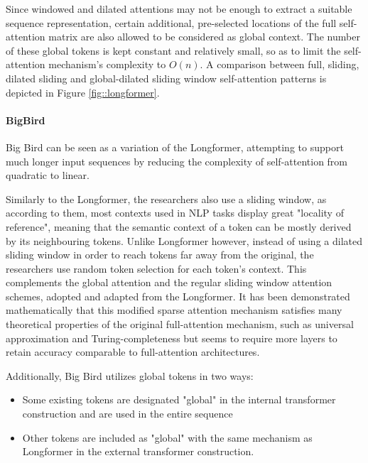 \documentclass[preprint,review,12pt]{elsarticle}
\begin{document}
Since windowed and dilated attentions may not be enough to extract a suitable sequence representation, certain additional, pre-selected locations of the full self-attention matrix are also allowed to be considered as global context. The number of these global tokens is kept constant and relatively small, so as to limit the self-attention mechanism's complexity to $O(n)$. A comparison between full, sliding, dilated sliding and global-dilated sliding window self-attention patterns is depicted in Figure \ref{fig::longformer}.


\paragraph{BigBird} Big Bird \cite{big_bird} can be seen as a variation of the Longformer, attempting to support much longer input sequences by reducing the complexity of self-attention from quadratic to linear. 

Similarly to the Longformer, the researchers also use a sliding window, as according to them, most contexts used in NLP tasks display great "locality of reference", meaning that the semantic context of a token can be mostly derived by its neighbouring tokens. Unlike Longformer however, instead of using a dilated sliding window in order to reach tokens far away from the original, the researchers use random token selection for each token's context. This complements the global attention and the regular sliding window attention schemes, adopted and adapted from the Longformer. It has been demonstrated mathematically that this modified sparse attention mechanism satisfies many theoretical properties of the original full-attention mechanism, such as universal approximation and Turing-completeness but seems to require more layers to retain accuracy comparable to full-attention architectures.

Additionally, Big Bird utilizes global tokens in two ways:
\begin{itemize}
    \item Some existing tokens are designated "global" in the internal transformer construction and are used in the entire sequence
    \item Other tokens are included as "global" with the same mechanism as Longformer in the external transformer construction. 
\end{itemize}
\end{document}
